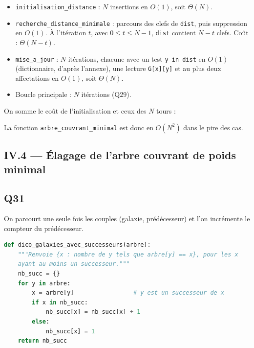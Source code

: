 \documentclass[11pt,a4paper]{article}
\providecommand{\tightlist}{\setlength{\itemsep}{0pt}\setlength{\parskip}{0pt}}
\newcommand{\equationajustee}[1]{%
  \sbox{\boiteequation}{$\displaystyle #1$}%
  \ifdim\wd\boiteequation>\linewidth
    \[\resizebox{\linewidth}{!}{\usebox{\boiteequation}}\]%
  \else
    \[#1\]%
  \fi}
\begin{document}
\begin{itemize}
\tightlist
\item
  \texttt{initialisation\_distance} : \(N\) insertions en \(O(1)\), soit \(\Theta(N)\).
\item
  \texttt{recherche\_distance\_minimale} : parcours des clefs de \texttt{dist}, puis suppression en \(O(1)\). À l'itération \(t\), avec \(0 \leqslant t \leqslant N-1\), \texttt{dist} contient \(N - t\) clefs. Coût : \(\Theta(N - t)\).
\item
  \texttt{mise\_a\_jour} : \(N\) itérations, chacune avec un test \texttt{y\ in\ dist} en \(O(1)\) (dictionnaire, d'après l'annexe), une lecture \texttt{G{[}x{]}{[}y{]}} et au plus deux affectations en \(O(1)\), soit \(\Theta(N)\).
\item
  Boucle principale : \(N\) itérations (Q29).
\end{itemize}

On somme le coût de l'initialisation et ceux des \(N\) tours :

\equationajustee{\begin{aligned}
C(N) &= \Theta(N) + \sum_{t=0}^{N-1} \big( \Theta(N - t) + \Theta(N) \big) \\
&= \Theta(N) + \Theta\!\left(\frac{N(N+1)}{2}\right) + \Theta(N^2).
\end{aligned}}

\equationajustee{\boxed{C(N) = \Theta(N^2)}}

La fonction \texttt{arbre\_couvrant\_minimal} est donc en \(O(N^2)\) dans le pire des cas.

\hypertarget{iv.4-uxe9lagage-de-larbre-couvrant-de-poids-minimal}{%
\subsection{IV.4 --- Élagage de l'arbre couvrant de poids minimal}\label{iv.4-uxe9lagage-de-larbre-couvrant-de-poids-minimal}}

\hypertarget{q31}{%
\subsection{Q31}\label{q31}}

On parcourt une seule fois les couples (galaxie, prédécesseur) et l'on incrémente le compteur du prédécesseur.

\begin{lstlisting}[language=Python]
def dico_galaxies_avec_successeurs(arbre):
    """Renvoie {x : nombre de y tels que arbre[y] == x}, pour les x
    ayant au moins un successeur."""
    nb_succ = {}
    for y in arbre:
        x = arbre[y]                 # y est un successeur de x
        if x in nb_succ:
            nb_succ[x] = nb_succ[x] + 1
        else:
            nb_succ[x] = 1
    return nb_succ
\end{lstlisting}
\end{document}
